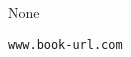 \thispagestyle{empty}
\begingroup
\footnotesize
\parindent 0pt
\parskip \baselineskip
\textcopyright{} None

\gitTag

\vfill

\texttt{www.book-url.com}

\vspace*{2\baselineskip}


\endgroup
\clearpage
